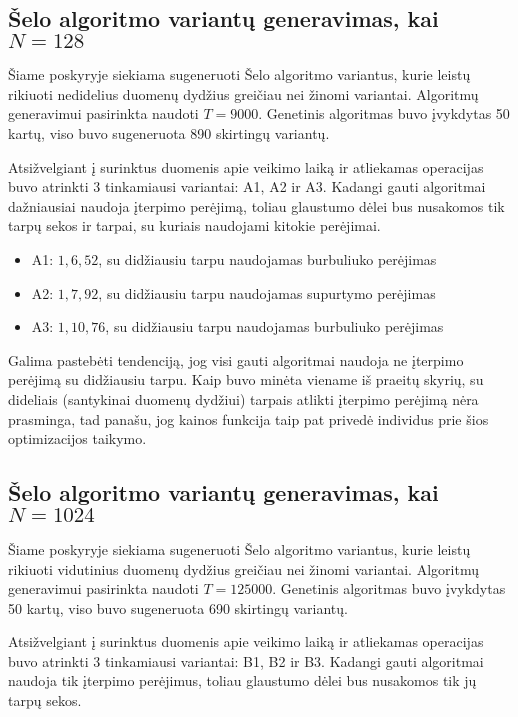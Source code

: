 \documentclass{VUMIFInfBakalaurinis}
\begin{document}
\subsection{Šelo algoritmo variantų generavimas, kai $N = 128$}

Šiame poskyryje siekiama sugeneruoti Šelo algoritmo variantus,
kurie leistų rikiuoti nedidelius duomenų dydžius greičiau nei žinomi variantai.
Algoritmų generavimui pasirinkta naudoti $T = 9000$.
Genetinis algoritmas buvo įvykdytas 50 kartų, viso buvo sugeneruota 890 skirtingų variantų.

Atsižvelgiant į surinktus duomenis apie veikimo laiką ir atliekamas operacijas buvo atrinkti 3 tinkamiausi variantai: A1, A2 ir A3.
Kadangi gauti algoritmai dažniausiai naudoja įterpimo perėjimą, toliau glaustumo dėlei bus nusakomos tik tarpų sekos ir tarpai, su kuriais naudojami kitokie perėjimai.

\begin{itemize}
  \item A1: $1, 6, 52$, su didžiausiu tarpu naudojamas burbuliuko perėjimas
  \item A2: $1, 7, 92$, su didžiausiu tarpu naudojamas supurtymo perėjimas
  \item A3: $1, 10, 76 $, su didžiausiu tarpu naudojamas burbuliuko perėjimas
\end{itemize}

Galima pastebėti tendenciją, jog visi gauti algoritmai naudoja ne įterpimo perėjimą su didžiausiu tarpu.
Kaip buvo minėta viename iš praeitų skyrių, su dideliais (santykinai duomenų dydžiui) tarpais atlikti įterpimo perėjimą nėra prasminga,
tad panašu, jog kainos funkcija taip pat privedė individus prie šios optimizacijos taikymo.

\subsection{Šelo algoritmo variantų generavimas, kai $N = 1024$}

Šiame poskyryje siekiama sugeneruoti Šelo algoritmo variantus,
kurie leistų rikiuoti vidutinius duomenų dydžius greičiau nei žinomi variantai.
Algoritmų generavimui pasirinkta naudoti $T = 125000$.
Genetinis algoritmas buvo įvykdytas 50 kartų, viso buvo sugeneruota 690 skirtingų variantų.

Atsižvelgiant į surinktus duomenis apie veikimo laiką ir atliekamas operacijas buvo atrinkti 3 tinkamiausi variantai: B1, B2 ir B3. 
Kadangi gauti algoritmai naudoja tik įterpimo perėjimus, toliau glaustumo dėlei bus nusakomos tik jų tarpų sekos.
\end{document}
